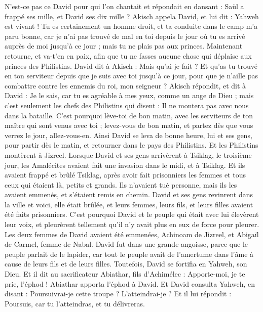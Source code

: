 \begin{multicols}{2}
N'est-ce pas ce David pour qui l’on chantait et répondait en dansant : Saül a frappé ses mille, et David ses dix mille ?
Akisch appela David, et lui dit : Yahweh est vivant ! Tu es certainement un homme droit, et ta conduite dans le camp m'a paru bonne, car je n'ai pas trouvé de mal en toi depuis le jour où tu es arrivé auprès de moi jusqu'à ce jour ; mais tu ne plais pas aux princes.
Maintenant retourne, et va-t'en en paix, afin que tu ne fasses aucune chose qui déplaise aux princes des Philistins.
David dit à Akisch : Mais qu'ai-je fait ? Et qu'as-tu trouvé en ton serviteur depuis que je suis avec toi jusqu'à ce jour, pour que je n'aille pas combattre contre les ennemis du roi, mon seigneur ?
Akisch répondit, et dit à David : Je le sais, car tu es agréable à mes yeux, comme un ange de Dieu ; mais c'est seulement les chefs des Philistins qui disent : Il ne montera pas avec nous dans la bataille.
C'est pourquoi lève-toi de bon matin, avec les serviteurs de ton maître qui sont venus avec toi ; levez-vous de bon matin, et partez dès que vous verrez le jour, allez-vous-en.
Ainsi David se leva de bonne heure, lui et ses gens, pour partir dès le matin, et retourner dans le pays des Philistins. Et les Philistins montèrent à Jizreel.
\VerseOne{}Lorsque David et ses gens arrivèrent à Tsiklag, le troisième jour, les Amalécites avaient fait une invasion dans le midi, et à Tsiklag. Et ils avaient frappé et brûlé Tsiklag,
après avoir fait prisonniers les femmes et tous ceux qui étaient là, petits et grands. Ils n’avaient tué personne, mais ils les avaient emmenés, et s’étaient remis en chemin.
David et ses gens revinrent dans la ville et voici, elle était brûlée, et leurs femmes, leurs fils, et leurs filles avaient été faits prisonniers.
C’est pourquoi David et le peuple qui était avec lui élevèrent leur voix, et pleurèrent tellement qu’il n’y avait plus en eux de force pour pleurer.
Les deux femmes de David avaient été emmenées, Achinoam de Jizreel, et Abigaïl de Carmel, femme de Nabal.
David fut dans une grande angoisse, parce que le peuple parlait de le lapider, car tout le peuple avait de l’amertume dans l’âme à cause de leurs fils et de leurs filles. Toutefois, David se fortifia en Yahweh, son Dieu.
Et il dit au sacrificateur Abiathar, fils d’Achimélec : Apporte-moi, je te prie, l’éphod ! Abiathar apporta l'éphod à David.
Et David consulta Yahweh, en disant : Poursuivrai-je cette troupe ? L’atteindrai-je ? Et il lui répondit : Poursuis, car tu l’atteindras, et tu délivreras.

\end{multicols}

